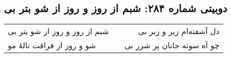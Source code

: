 \begin{center}
\section*{دوبیتی شماره ۲۸۴: شبم از روز و روز از شو بتر بی}
\label{sec:284}
\begin{longtable}{l p{0.5cm} r}
شبم از روز و روز از شو بتر بی
&&
دل آشفته‌ام زیر و زبر بی
\\
شو و روز از فراقت نالهٔ مو
&&
چو آه سوته جانان پر شرر بی
\\
\end{longtable}
\end{center}
